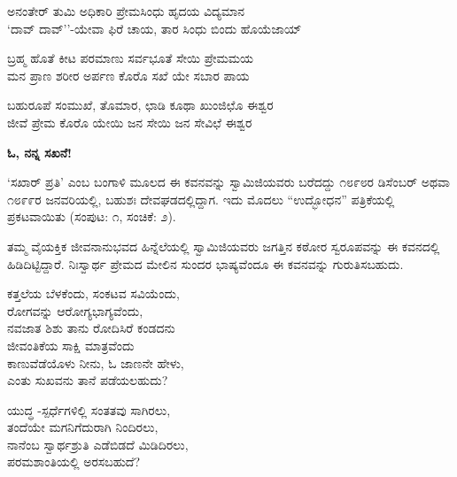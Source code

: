 
\begin{myquote}
ಅನಂತೇರ್ ತುಮಿ ಅಧಿಕಾರಿ ಪ್ರೇಮಸಿಂಧು ಹೃದಯ ವಿದ್ಯಮಾನ\\‘ದಾವ್ ದಾವ್’'-ಯೇವಾ ಫಿರೆ ಚಾಯ, ತಾರ ಸಿಂಧು ಬಿಂದು ಹೊಯೆಜಾಯ್
\end{myquote}


\begin{myquote}
ಬ್ರಹ್ಮ ಹೊತೆ ಕೀಟ ಪರಮಾಣು ಸರ್ವಭೂತೆ ಸೇಯಿ ಪ್ರೇಮಮಯ\\ಮನ ಪ್ರಾಣ ಶರೀರ ಅರ್ಪಣ ಕೊರೊ ಸಖೆ ಯೇ ಸಬಾರ ಪಾಯ
\end{myquote}


\begin{myquote}
ಬಹುರೂಪೆ ಸಂಮುಖೆ, ತೊಮಾರ, ಛಾಡಿ ಕೂಥಾ ಖುಂಜಿಛೊ ಈಶ್ವರ\\ಜೀವೆ ಪ್ರೇಮ ಕೊರೊ ಯೇಯಿ ಜನ ಸೇಯಿ ಜನ ಸೇವಿಛೆ ಈಶ್ವರ
\end{myquote}


\begin{center}
\textbf{ಓ, ನನ್ನ ಸಖನೆ!}
\end{center}

‘ಸಖಾರ್ ಪ್ರತಿ’ ಎಂಬ ಬಂಗಾಳಿ ಮೂಲದ ಈ ಕವನವನ್ನು ಸ್ವಾಮಿಜಿಯವರು ಬರೆದದ್ದು ೧೮೯೮ರ ಡಿಸೆಂಬರ್ ಅಥವಾ ೧೮೯೯ರ ಜನವರಿಯಲ್ಲಿ, ಬಹುಶಃ ದೇವಘಡದಲ್ಲಿದ್ದಾಗ. ಇದು ಮೊದಲು “ಉದ್ಭೋಧನ” ಪತ್ರಿಕೆಯಲ್ಲಿ ಪ್ರಕಟವಾಯಿತು (ಸಂಪುಟ: ೧, ಸಂಚಿಕೆ: ೨).

ತಮ್ಮ ವೈಯಕ್ತಿಕ ಜೀವನಾನುಭವದ ಹಿನ್ನೆಲೆಯಲ್ಲಿ ಸ್ವಾಮಿಜಿಯವರು ಜಗತ್ತಿನ ಕಠೋರ ಸ್ವರೂಪವನ್ನು ಈ ಕವನದಲ್ಲಿ ಹಿಡಿದಿಟ್ಟಿದ್ದಾರೆ. ನಿಃಸ್ವಾರ್ಥ ಪ್ರೇಮದ ಮೇಲಿನ ಸುಂದರ ಭಾಷ್ಯವೆಂದೂ ಈ ಕವನವನ್ನು ಗುರುತಿಸಬಹುದು.

\begin{myquote}
ಕತ್ತಲೆಯ ಬೆಳಕೆಂದು, ಸಂಕಟವ ಸವಿಯೆಂದು,\\ರೋಗವನ್ನು ಆರೋಗ್ಯಭಾಗ್ಯವೆಂದು,\\ನವಜಾತ ಶಿಶು ತಾನು ರೋದಿಸಿರೆ ಕಂಡದನು\\ಜೀವಂತಿಕೆಯ ಸಾಕ್ಷಿ ಮಾತ್ರವೆಂದು\\ಕಾಣುವೆಡೆಯೊಳು ನೀನು, ಓ ಜಾಣನೇ ಹೇಳು,\\ಎಂತು ಸುಖವನು ತಾನೆ ಪಡೆಯಲಹುದು?
\end{myquote}

\begin{myquote}
ಯುದ್ಧ -ಸ್ಪರ್ಧೆಗಳಿಲ್ಲಿ ಸಂತತವು ಸಾಗಿರಲು,\\ತಂದೆಯೇ ಮಗನಿಗೆದುರಾಗಿ ನಿಂದಿರಲು,\\ನಾನೆಂಬ ಸ್ವಾರ್ಥಶ್ರುತಿ ಎಡೆಬಿಡದೆ ಮಿಡಿದಿರಲು,\\ಪರಮಶಾಂತಿಯಲ್ಲಿ ಅರಸಬಹುದೆ? 
\end{myquote}

